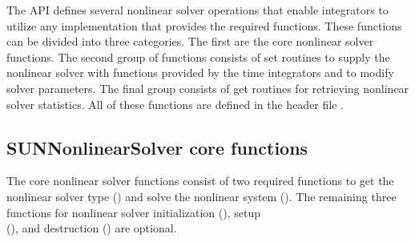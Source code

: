 The {\sunnonlinsol} API defines several nonlinear solver operations that enable
{\sundials} integrators to utilize any {\sunnonlinsol} implementation that
provides the required functions. These functions can be divided into three
categories. The first are the core nonlinear solver functions. The second group
of functions consists of set routines to supply the nonlinear solver with
functions provided by the {\sundials} time integrators and to modify solver
parameters. The final group consists of get routines for retrieving nonlinear
solver statistics. All of these functions are defined in the header file
.

\subsection{SUNNonlinearSolver core functions}
\label{ss:sunnonlinsol_corefn}
The core nonlinear solver functions consist of two required functions to get the
nonlinear solver type () and solve the nonlinear system
(). The remaining three functions for nonlinear solver
initialization (), setup\\ \noindent
(), and destruction () are optional.

